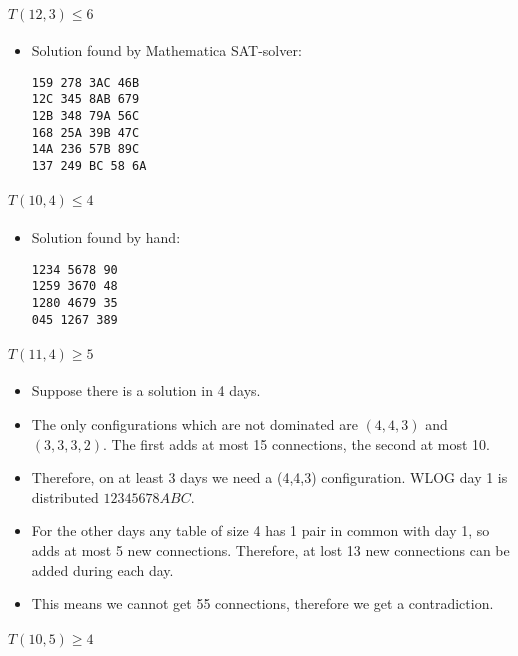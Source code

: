 \documentclass[a4paper]{article}
\begin{document}
\paragraph{$T(12,3) \leq  6$}

\begin{itemize}
\item
  Solution found by Mathematica SAT-solver:

\begin{verbatim}
159 278 3AC 46B
12C 345 8AB 679
12B 348 79A 56C
168 25A 39B 47C
14A 236 57B 89C
137 249 BC 58 6A
\end{verbatim}
\end{itemize}

\paragraph{$T(10,4) \leq  4$}

\begin{itemize}
\item
  Solution found by hand:

\begin{verbatim}
1234 5678 90
1259 3670 48
1280 4679 35
045 1267 389
\end{verbatim}
\end{itemize}

\paragraph{$T(11,4) \geq  5$}

\begin{itemize}

\item
  Suppose there is a solution in 4 days.
\item
  The only configurations which are not dominated are $(4,4,3)$
  and $(3,3,3,2)$. The first adds at most 15 connections, the
  second at most 10.
\item
  Therefore, on at least 3 days we need a (4,4,3) configuration. WLOG
  day 1 is distributed $12345678ABC$.
\item
  For the other days any table of size 4 has 1 pair in common with day
  1, so adds at most 5 new connections. Therefore, at lost 13 new
  connections can be added during each day.
\item
  This means we cannot get 55 connections, therefore we get a
  contradiction.
\end{itemize}

\paragraph{$T(10,5) \geq  4$}
\end{document}
